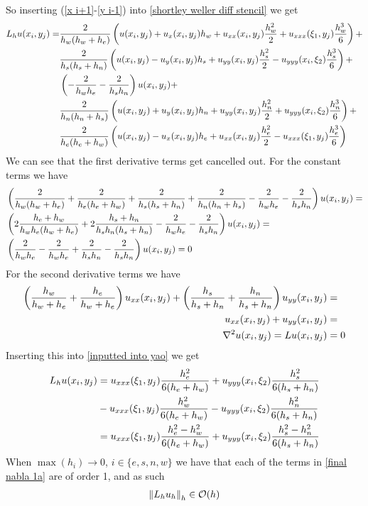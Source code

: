\documentclass{homework}
\begin{document}
So inserting (\ref{x i+1}-\ref{y i-1}) into \eqref{shortley weller diff stencil} we get
\begin{align}
\begin{aligned}
L_hu(x_{i},y_{j})
=&
    \frac{2}{h_w(h_w+h_e)}\left(u(x_{i},y_{j}) + u_x(x_{i},y_{j})h_w + u_{xx}(x_{i},y_{j})\frac{h_w^2}{2} + u_{xxx}(\xi_1,y_{j})\frac{h_w^3}{6} \right) +\\
    &\frac{2}{h_s(h_s+h_n)}\left(u(x_{i},y_{j}) - u_{y}(x_{i},y_{j})h_s + u_{yy}(x_{i},y_{j})\frac{h_s^2}{2} - u_{yyy}(x_{i},\xi_2)\frac{h_s^3}{6} \right) +\\
    &\left(-\frac{2}{h_wh_e}-\frac{2}{h_sh_n}\right)u(x_{i},y_{j})+\\
    &\frac{2}{h_n(h_n+h_s)}\left(u(x_{i},y_{j}) + u_{y}(x_{i},y_{j})h_n + u_{yy}(x_{i},y_{j})\frac{h_n^2}{2} + u_{yyy}(x_{i},\xi_2)\frac{h_n^3}{6} \right) +\\
    &\frac{2}{h_e(h_e+h_w)}\left(u(x_{i},y_{j}) - u_{x}(x_{i},y_{j})h_e + u_{xx}(x_{i},y_{j})\frac{h_e^2}{2} - u_{xxx}(\xi_1,y_{j})\frac{h_e^3}{6} \right)
    \label{inputted into yao}
\end{aligned}
\end{align}
We can see that the first derivative terms get cancelled out. For the constant terms we have
\begin{align*}
    &\left(\frac{2}{h_w(h_w+h_e)}+\frac{2}{h_e(h_e+h_w)}+\frac{2}{h_s(h_s+h_n)}+\frac{2}{h_n(h_n+h_s)}-\frac{2}{h_wh_e}-\frac{2}{h_sh_n} \right)u(x_{i},y_{j})=\\&
    \left(
    2\frac{h_e+h_w}{h_wh_e(h_w+h_e)}+2\frac{h_s+h_n}{h_sh_n(h_s+h_n)}-\frac{2}{h_wh_e}-\frac{2}{h_sh_n}
    \right)u(x_{i},y_{j})=\\&
    \left(\frac{2}{h_wh_e}-\frac{2}{h_wh_e}+\frac{2}{h_sh_n}-\frac{2}{h_sh_n}\right)u(x_{i},y_{j})=0
\end{align*}
For the second derivative terms we have
\begin{align}
\left(\frac{h_w}{h_w+h_e}+\frac{h_e}{h_w+h_e}\right)
    u_{xx}(x_{i},y_{j})+
    \left(
    \frac{h_s}{h_s+h_n}+\frac{h_n}{h_s+h_n}
    \right)
    u_{yy}(x_{i},y_{j})&=
    \\
    u_{xx}(x_{i},y_{j})+u_{yy}(x_{i},y_{j}) &= \\
    \nabla^2u(x_{i},y_{j}) = Lu(x_{i},y_{j}) &= 0
\end{align}
Inserting this into \eqref{inputted into yao} we get
\begin{align}
    L_hu(x_{i},y_{j}) &= u_{xxx}(\xi_1,y_{j})\frac{h_e^2}{6(h_e+h_w)}+u_{yyy}(x_{i},\xi_2)\frac{h_s^2}{6(h_s+h_n)}\nonumber\\&-
    u_{xxx}(\xi_1,y_{j})\frac{h_w^2}{6(h_e+h_w)}-u_{yyy}(x_{i},\xi_2)\frac{h_n^2}{6(h_s+h_n)}\nonumber\\
    &= u_{xxx}(\xi_1,y_j)\frac{h_e^2-h_w^2}{6(h_e+h_w)} + u_{yyy}(x_i,\xi_2)\frac{h_s^2-h_n^2}{6(h_s+h_n)}\label{final nabla 1a}
\end{align}
When $\max(h_i)\to 0$, $i\in\{e,s,n,w\}$ we have that each of the terms in \eqref{final nabla 1a} are of order 1, and as such
\begin{align}
    \norm{L_hu_h}_h \in \mathcal{O}(h)\nonumber
\end{align}
\end{document}
